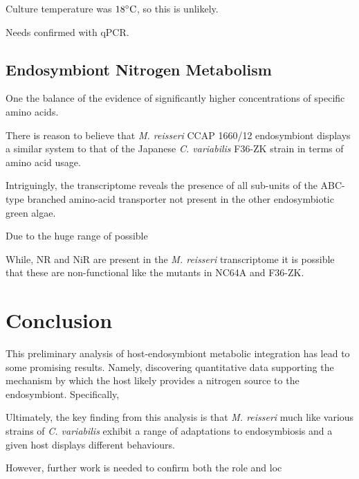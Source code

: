 Culture temperature was \(18\celsius\), so this is unlikely. 

Needs confirmed with qPCR. 





\subsection{Endosymbiont Nitrogen Metabolism}

One the balance of the evidence of significantly higher concentrations
of specific amino acids.

There is reason to believe that \textit{M. reisseri} CCAP 1660/12
endosymbiont displays a similar system to that of the Japanese
\textit{C. variabilis} F36-ZK strain in terms of amino acid usage. 

Intriguingly, the transcriptome reveals the presence of all sub-units
of the ABC-type branched amino-acid transporter not present in 
the other endosymbiotic green algae. 

Due to the huge range of possible 


While, NR and NiR are present in the \textit{M. reisseri} transcriptome
it is possible that these are non-functional like the mutants in 
NC64A and F36-ZK.




\section{Conclusion}

This preliminary analysis of host-endosymbiont metabolic integration 
has lead to some promising results.
Namely, discovering quantitative data supporting the mechanism by which
the host likely provides a nitrogen source to the endosymbiont. 
Specifically, 





Ultimately, the key finding from this analysis
is that \textit{M. reisseri} much like various strains of \textit{C. variabilis}
exhibit a range of adaptations to endosymbiosis and a given
host displays different behaviours. 







However, further work is needed to confirm both the role and loc

%

